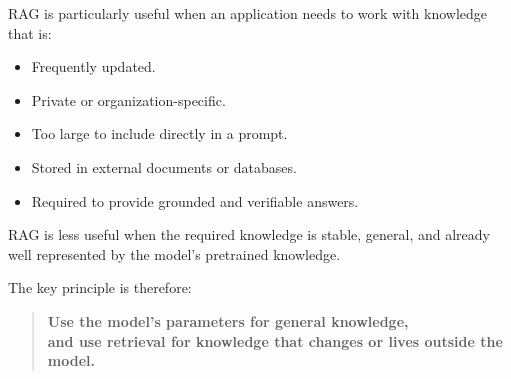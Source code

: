 RAG is particularly useful when an application needs to work with knowledge that is:

\begin{itemize}
    \item Frequently updated.
    \item Private or organization-specific.
    \item Too large to include directly in a prompt.
    \item Stored in external documents or databases.
    \item Required to provide grounded and verifiable answers.
\end{itemize}

RAG is less useful when the required knowledge is stable, general, and already well represented by the model's pretrained knowledge.

The key principle is therefore:

\begin{quote}
\centering
\textbf{Use the model's parameters for general knowledge,}\\
\textbf{and use retrieval for knowledge that changes or lives outside the model.}
\end{quote}
